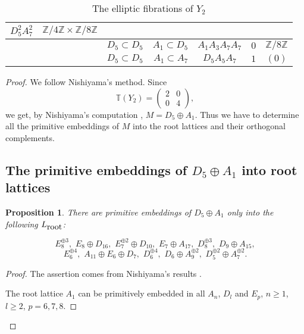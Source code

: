 \documentclass{amsart}
\newtheorem{proposition}{Proposition}
\begin{document}
\begin{table}
\begin{center}
\begin{tabular}{|l|r|r|r|c|c|c|}
 $D_5^2 A_7^2$    &  $\mathbb Z /{4 \mathbb Z}\times \mathbb Z /{8\mathbb Z} $ & & & & &\\ \hline
&   & $D_5 \subset D_5$ & $A_1 \subset D_5$  & $A_1  A_{3} A_7 A_7$ & $0$ & $\mathbb Z /{8 \mathbb Z}$\\ \hline
&   & $D_5 \subset D_5$ & $A_1 \subset A_7$  & $D_5 A_5 A_7 $ & $1$ & $(0)$\\ \hline

\end{tabular}
\end{center}
\caption{The elliptic fibrations of $Y_2$}
\end{table}


\begin{proof}
We follow Nishiyama's method. Since 
$$\mathbb T(Y_2)=\left ( \begin{matrix}
                 2 &  0 \\
                 0  & 4
                    \end{matrix}
                   \right ),
                   $$
we get, by Nishiyama's computation \cite{Nis}, $M=D_5 \oplus A_1$. Thus we have to determine all the primitive embeddings of $M$ into the root lattices and their orthogonal complements.
              




\subsection{The primitive embeddings of $D_5 \oplus A_1$ into root lattices}

\begin{proposition}
There are primitive embeddings of $D_5\oplus A_1$ only into the following $L_{\hbox{root}}$:


$$E_8^{\oplus 3}, \,\, E_8\oplus D_{16}, \,\, E_7^{\oplus 2}\oplus D_{10}, \,\, E_7\oplus A_{17}, \,\, D_8^{\oplus 3}, \,\, D_9\oplus A_{15},$$
$$ E_6^{\oplus 4}, \,\, A_{11}\oplus E_6\oplus D_7, \,\, D_6^{\oplus 4}, \,\, D_6\oplus A_9^{\oplus 2}, \,\,D_5^{\oplus 2}\oplus A_7^{\oplus 2}.$$

\end{proposition}




\begin{proof}
The assertion comes from Nishiyama's results \cite{Nis}. 

The root lattice $A_1$ can be primitively embedded in all $A_n$, $D_l$ and $E_p$, $n\geq 1$, $l\geq 2$, $p=6,7,8$.


\end{proof}
\end{proof}
\end{document}

